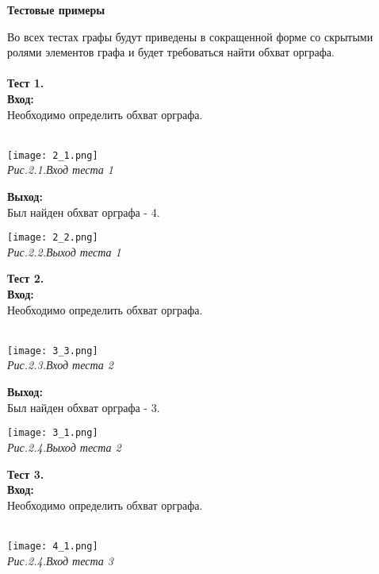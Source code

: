 \documentclass[a4paper,11pt]{article}
\begin{document}
\begin{center}
    \Large{\textbf{Тестовые примеры}}
\end{center}
\begin{flushleft}
Во всех тестах графы будут приведены в сокращенной форме со скрытыми ролями элементов графа и будет требоваться найти обхват орграфа.
\\ 
\\
\large{\textbf{Тест 1.}} \\
\large{\textbf{Вход:}} \\
Необходимо определить обхват орграфа. \\
\end{flushleft} \\ 
\texttt{[image: 2\_1.png]} \\ \textit{Рис.2.1.Вход теста 1} \\
\begin{flushleft}
\large{\textbf{Выход:}} \\ 
Был найден обхват орграфа - 4.
\end{flushleft}
\texttt{[image: 2\_2.png]} \\ \textit{Рис.2.2.Выход теста 1} \\
\begin{flushleft}
\large{\textbf{Тест 2.}} \\
\large{\textbf{Вход:}} \\
Необходимо определить обхват орграфа. \\
\end{flushleft} \\ 
\texttt{[image: 3\_3.png]} \\ \textit{Рис.2.3.Вход теста 2} \\
\begin{flushleft}
\large{\textbf{Выход:}} \\ 
Был найден обхват орграфа - 3.
\end{flushleft}
\texttt{[image: 3\_1.png]} \\ \textit{Рис.2.4.Выход теста 2} \\
\begin{flushleft}
\large{\textbf{Тест 3.}} \\
\large{\textbf{Вход:}} \\
Необходимо определить обхват орграфа. \\
\end{flushleft} \\ 
\texttt{[image: 4\_1.png]} \\ \textit{Рис.2.4.Вход теста 3} \\
\end{document}
